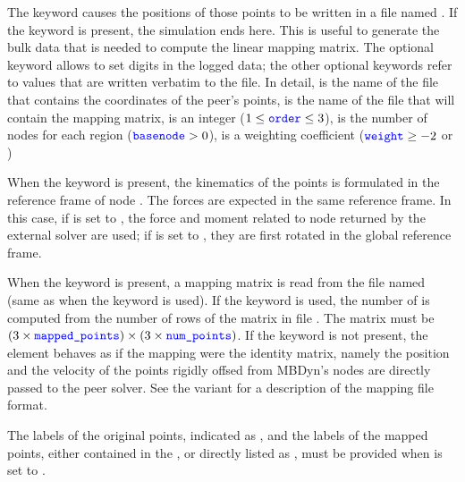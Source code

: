 The  keyword causes the positions of those points
to be written in a file named .
If the keyword  is present, the simulation ends here.
This is useful to generate the bulk data that is needed to compute
the linear mapping matrix.
The optional keyword  allows to set 
digits in the logged data; the other optional keywords refer to values
that are written verbatim to the file.
In detail,  is the name of the file that contains
the coordinates of the peer's points, 
is the name of the file that will contain the mapping matrix,
 is an integer ($1 \le \textcolor{blue}{\texttt{order}} \le 3$),
 is the number of nodes for each region ($\textcolor{blue}{\texttt{basenode}} > 0$),
 is a weighting coefficient ($\textcolor{blue}{\texttt{weight}} \ge -2$ or )

When the  keyword is present, the kinematics
of the points is formulated in the reference frame of node
.
The forces are expected in the same reference frame.
In this case, if  is set to ,
the force and moment related to node  
returned by the external solver are used;
if  is set to ,
they are first rotated in the global reference frame.

When the  keyword is present,
a mapping matrix is read from the file named 
(same as  when the  keyword is used).
If the keyword  is used, the number of 
is computed from the number of rows of the matrix
in file .
The matrix must be
$(3 \times \textcolor{blue}{\texttt{mapped\_points}}) \times (3 \times \textcolor{blue}{\texttt{num\_points}})$.
If the  keyword is not present,
the element behaves as if the mapping were the identity matrix,
namely the position and the velocity of the points rigidly offsed
from MBDyn's nodes are directly passed to the peer solver.
See the 
variant for a description of the mapping file format.

The labels of the original points, indicated as ,
and the labels of the mapped points, either contained
in the ,
or directly listed as , must be provided
when  is set to .



